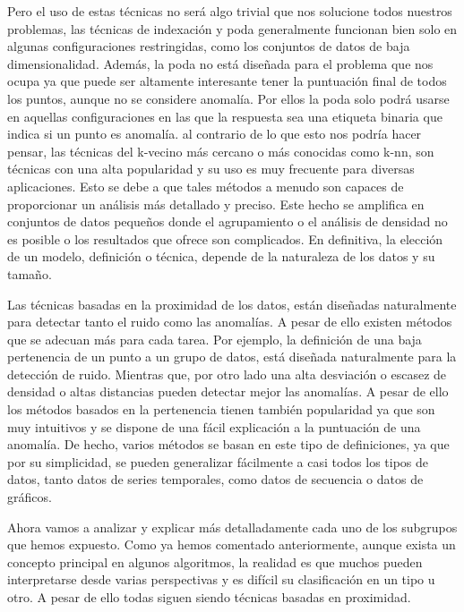 Pero el uso de estas técnicas no será algo trivial que nos solucione todos
nuestros problemas, las técnicas de indexación y poda generalmente 
funcionan bien solo en algunas configuraciones restringidas, como los 
conjuntos de datos de baja dimensionalidad. Además, la poda no está diseñada
para el problema que nos ocupa ya que puede ser altamente interesante tener
la puntuación final de todos los puntos, aunque no se considere anomalía. Por
ellos la poda solo podrá usarse en aquellas configuraciones en las que la
respuesta sea una etiqueta binaria que indica si un punto es anomalía.
al contrario de lo que esto nos podría hacer pensar, las técnicas 
del k-vecino más cercano o más conocidas como k-nn, son técnicas
con una alta popularidad y su uso es muy frecuente para diversas aplicaciones.
Esto se debe a que tales métodos a menudo son capaces de proporcionar un
análisis más detallado y preciso. Este hecho se amplifica en conjuntos de 
datos pequeños donde el agrupamiento o el análisis de densidad no es posible
o los resultados que ofrece son complicados. En definitiva, la elección de 
un modelo, definición o técnica, depende de la naturaleza de los datos y
su tamaño.

Las técnicas basadas en la proximidad de los datos, están diseñadas naturalmente
para detectar tanto el ruido como las anomalías. A pesar de ello existen 
métodos que se adecuan más para cada tarea. Por ejemplo, la definición
de una baja pertenencia de un punto a un grupo de datos, está diseñada
naturalmente para la detección de ruido. Mientras que, por otro lado 
una alta desviación o escasez de densidad o altas distancias pueden 
detectar mejor las anomalías. A pesar de ello los métodos basados en la 
pertenencia tienen también popularidad ya que son muy intuitivos y 
se dispone de una fácil explicación a la puntuación de una anomalía.
De hecho, varios métodos se basan en este tipo de definiciones, ya que 
por su simplicidad, se pueden generalizar fácilmente a casi todos los 
tipos de datos, tanto datos de series temporales, como datos de secuencia
o datos de gráficos.

Ahora vamos a analizar y explicar más detalladamente cada uno de los subgrupos
que hemos expuesto. Como ya hemos comentado anteriormente, aunque exista
un concepto principal en algunos algoritmos, la realidad es que muchos 
pueden interpretarse desde varias perspectivas y es difícil su clasificación
en un tipo u otro. A pesar de ello todas siguen siendo técnicas basadas 
en proximidad.


